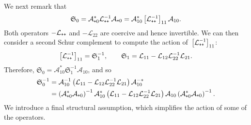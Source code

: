 \documentclass{article}
\newcommand{\cL}{\mathcal{L}}
\newcommand{\cLa}{\mathcal{A}}
\newcommand{\Schur}{\mathfrak{S}_0}
\newcommand{\Schurb}{\mathfrak{S}_1}
\newcommand{\subplus}{\textnormal{\texttt{+}}}
\begin{document}
We next remark that
\begin{equation}
  \label{eq:Schur_L++11}
\Schur = \cLa_{\subplus0}^{*} \cL_{\subplus\subplus}^{-1} \cLa_{\subplus0} = \cLa_{10}^{*} \left[\cL_{\subplus\subplus}^{-1}\right]_{11} \cLa_{10}.
\end{equation}
Both operators $-\cL_{\subplus\subplus}$ and $-\cL_{22}$ are coercive and hence invertible. We can then consider a second Schur complement to compute the action of~$\left[\cL_{\subplus\subplus}^{-1}\right]_{11}$:
\[
\left[\cL_{\subplus\subplus}^{-1}\right]_{11} = \Schurb^{-1}, \qquad \Schurb = \cL_{11} - \cL_{12} \cL_{22}^{-1} \cL_{21}.
\]
Therefore, $\Schur = \cLa_{10}^{*} \Schurb^{-1}\cLa_{10}$, and so
\begin{equation}
  \begin{aligned}
  \label{eq:Schur-1}
  \Schur^{-1}
  & = \cLa_{10}^{-1}\left( \cL_{11} - \cL_{12} \cL_{22}^{-1} \cL_{21} \right)\cLa_{10}^{-*} \\
  & = \left(\cLa_{\subplus0}^*\cLa_{\subplus0}\right)^{-1} \cLa_{10}^* \left( \cL_{11} - \cL_{12} \cL_{22}^{-1} \cL_{21} \right) \cLa_{10} \left(\cLa_{\subplus0}^*\cLa_{\subplus0}\right)^{-1}.
  \end{aligned}
\end{equation}
We introduce a final structural assumption, which simplifies the action of some of the operators.
\end{document}
